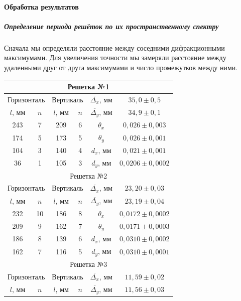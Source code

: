 \documentclass[12pt]{article}
\begin{document}
	\paragraph{Обработка результатов}
	\subparagraph{Определение периода решёток по их пространственному спектру}
	Сначала мы определяли расстояние между соседними дифракционными максимумами. Для увеличения точности мы замеряли расстояние между удаленными друг от друга максимумами и число промежутков между ними.
	\begin{center}
	\begin{tabular}{|c|c|c|c||c|c|}
		\hline
		\multicolumn{6}{|c|}{Решетка №1} \\
		\hline 
		\multicolumn{2}{|c|}{Горизонталь}& \multicolumn{2}{|c||}{Вертикаль} & $\overline{\Delta_{x}}$, мм & $35,0\pm 0,5$ \\ 
		\hline 
		$l$, мм  & $n$ & $l$, мм & $n$ & $\overline{\Delta_{y}}$, мм & $34,9 \pm 0,1$\\ 
		\hline 
		243 & 7 & 209 & 6 & $\theta_x$ & $0,026 \pm 0,003$\\ 
		\hline 
		174 & 5 & 173 & 5 & $\theta_y$ & $0, 026 \pm 0,001$\\ 
		\hline 
		104 & 3 & 140 & 4 &$d_x$, мм & $0,021 \pm 0,001$ \\ 
		\hline 
		36 & 1 & 105 & 3 & $d_y$, мм & $0,0206 \pm 0,0002$\\ 
		\hline
		\multicolumn{6}{|c|}{Решетка №2} \\
		\hline 
		\multicolumn{2}{|c|}{Горизонталь}& \multicolumn{2}{|c||}{Вертикаль}  & $\overline{\Delta_{x}}$, мм & $23,20 \pm 0,03$\\ 
		\hline 
		$l$, мм  & $n$ & $l$, мм & $n$  & $\overline{\Delta_{y}}$, мм & $23,19 \pm 0,04$\\ 
		\hline 
		232 & 10 & 186 & 8 & $\theta_x$ & $0,0172\pm 0,0002$  \\ 
		\hline 
		209 & 9 & 162 & 7 & $\theta_y$ & $0,0171 \pm 0,0003$\\ 
		\hline 
		186 & 8 & 139 & 6 & $d_x$, мм& $0,0310 \pm 0,0002$ \\ 
		\hline 
		162 & 7 & 116 & 5 & $d_y$, мм& $0,0310 \pm 0,0001$ \\ 
		\hline
		\multicolumn{6}{|c|}{Решетка №3} \\
		\hline 
		\multicolumn{2}{|c|}{Горизонталь}& \multicolumn{2}{|c||}{Вертикаль}  & $\overline{\Delta_{x}}$, мм & $11,59 \pm 0,02$\\ 
		\hline 
		$l$, мм  & $n$ & $l$, мм & $n$  & $\overline{\Delta_{y}}$, мм & $11,56 \pm 0,03$\\ 

\end{tabular}
\end{center}
\end{document}
